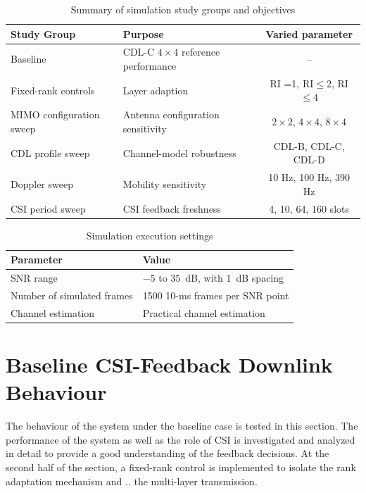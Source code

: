 \documentclass[a4paper,12pt,onecolumn]{article}
\begin{document}
	\begin{table}[H]
		\centering
		\caption{Summary of simulation study groups and objectives}
		\label{tab:sim_studies}
		\begin{tabular}{llc}
			\hline
			\textbf{Study Group} & \textbf{Purpose} &Varied parameter \\
			\toprule
			Baseline             & CDL-C $4\times4$ reference  performance       & -- \\
			Fixed-rank controls  & Layer adaption         & RI =1, RI$\leq 2$, RI $\leq 4$\\ 
			MIMO configuration sweep        & Antenna configuration sensitivity            &  \(2 \times 2\), \(4 \times 4\), \(8 \times 4\)  \\  
			CDL profile sweep            & Channel-model robustness         & CDL-B, CDL-C, CDL-D  \\ 
			Doppler sweep        & Mobility sensitivity          & 10 Hz, 100 Hz, 390 Hz  \\
			CSI period sweep     & CSI feedback freshness              & 4, 10, 64, 160 slots \\  
			\hline
		\end{tabular}
	\end{table}
	
	\begin{table}[H]
		\centering
		\caption{Simulation execution settings}
		\label{tab:simulation_execution}
		\begin{tabular}{ll}
			\toprule
			Parameter & Value \\
			\midrule
			SNR range & $-5$ to $35$~dB, with 1~dB spacing \\
			Number of simulated frames & 1500 10-ms frames per SNR point \\
			Channel estimation & Practical channel estimation \\
			\bottomrule
		\end{tabular}
	\end{table}
\section{Baseline CSI-Feedback Downlink Behaviour}
	\label{sec:3}
	\begin{highlightblock}
		The behaviour of the system under the baseline case is tested in this section. The performance of the system as well as the role of CSI is investigated and analyzed in detail to provide a good understanding of the feedback decisions. At the second half of the section, a fixed-rank control is implemented to isolate the rank adaptation mechanism and .. the multi-layer transmission.
	\end{highlightblock}
	
\end{document}
